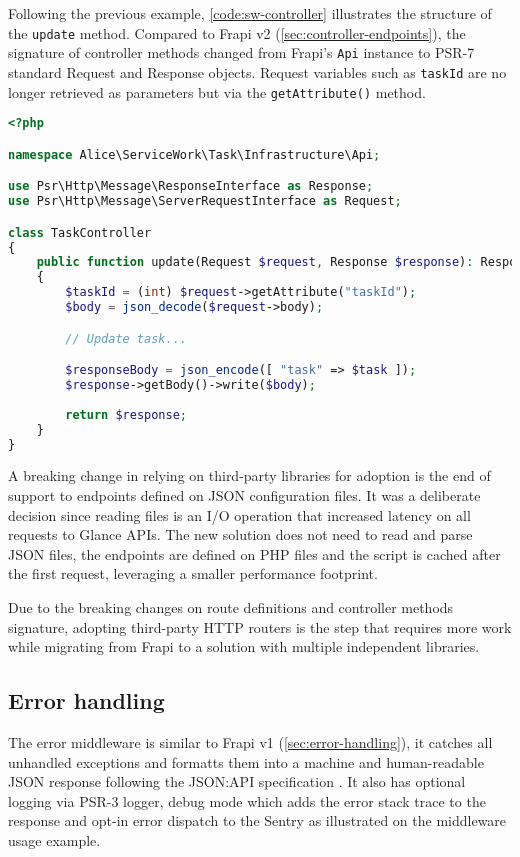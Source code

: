 Following the previous example, \autoref{code:sw-controller} illustrates the structure of the \texttt{update} method. Compared to Frapi v2 (\autoref{sec:controller-endpoints}), the signature of controller methods changed from Frapi's \texttt{Api} instance to PSR-7 standard Request and Response objects. Request variables such as \texttt{taskId} are no longer retrieved as parameters but via the \texttt{getAttribute()} method.

\begin{lstlisting}[language=PHP,label={code:sw-controller},caption={Controller class on a stack without FENCE and Frapi.}]
<?php

namespace Alice\ServiceWork\Task\Infrastructure\Api;

use Psr\Http\Message\ResponseInterface as Response;
use Psr\Http\Message\ServerRequestInterface as Request;

class TaskController
{
	public function update(Request $request, Response $response): Resposne
	{
		$taskId = (int) $request->getAttribute("taskId");
		$body = json_decode($request->body);

		// Update task...

		$responseBody = json_encode([ "task" => $task ]);
		$response->getBody()->write($body);
	
		return $response;
	}
}
\end{lstlisting}

A breaking change in relying on third-party libraries for adoption is the end of support to endpoints defined on JSON configuration files. It was a deliberate decision since reading files is an I/O operation that increased latency on all requests to Glance APIs. The new solution does not need to read and parse JSON files, the endpoints are defined on PHP files and the script is cached after the first request, leveraging a smaller performance footprint.

Due to the breaking changes on route definitions and controller methods signature, adopting third-party HTTP routers is the step that requires more work while migrating from Frapi to a solution with multiple independent libraries.

\subsection{Error handling}

The error middleware \cite{error-middleware} is similar to Frapi v1 (\autoref{sec:error-handling}), it catches all unhandled exceptions and formatts them into a machine and human-readable JSON response following the JSON:API specification \cite{json-api-error}. It also has optional logging via PSR-3 logger, debug mode which adds the error stack trace to the response and opt-in error dispatch to the Sentry \cite{sentry-about} \cite{sentry-php-sdk} as illustrated on the middleware usage example.

